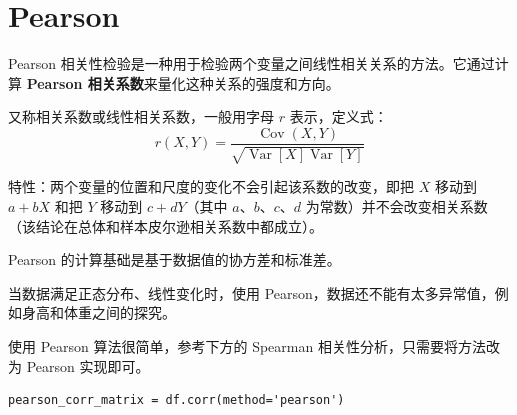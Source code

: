 \section{Pearson}

\begin{definition}[Pearson]
    Pearson 相关性检验是一种用于检验两个变量之间线性相关关系的方法。它通过计算 \textbf{Pearson 相关系数}来量化这种关系的强度和方向。
\end{definition}

\begin{theorem}
    又称相关系数或线性相关系数，一般用字母 $r$ 表示，定义式：
    $$
        r(X, Y)=\frac{\operatorname{Cov}(X, Y)}{\sqrt{\operatorname{Var}[X] \operatorname{Var}[Y]}}
    $$
\end{theorem}

\begin{corollary}[系数特性]
    特性：两个变量的位置和尺度的变化不会引起该系数的改变，即把 $X$ 移动到 $a+b X$ 和把 $Y$ 移动到 $c+d Y$（其中 $a$、$b$、$ c$、$d$ 为常数）并不会改变相关系数（该结论在总体和样本皮尔逊相关系数中都成立）。
\end{corollary}

Pearson 的计算基础是基于数据值的协方差和标准差。

\begin{tips}
当数据满足正态分布、线性变化时，使用 Pearson，数据还不能有太多异常值，例如身高和体重之间的探究。
\end{tips}

使用 Pearson 算法很简单，参考下方的 Spearman 相关性分析，只需要将方法改为 Pearson 实现即可。

\begin{lstlisting}[style=python]
pearson_corr_matrix = df.corr(method='pearson')
\end{lstlisting}


